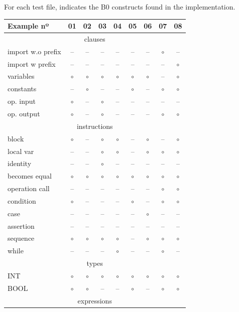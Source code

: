 \documentclass{llncs}
\begin{document}
\begin{enumerate}
For each test file, indicates the B0 constructs found in the implementation.
\begin{center}
\newcommand{\no}[0]{--}
\newcommand{\yes}[0]{$\circ$}
\begin{tabular}{|l|c|c|c|c|c|c|c|c|}
\hline
Example nº & 01 & 02 & 03 & 04 & 05 & 06 & 07 & 08 \\
\hline
\hline
\multicolumn{9}{|c|}{clauses} \\
\hline
import w.o prefix & \no & \no & \no & \no & \no & \no & \yes & \no \\
import w prefix & \no & \no & \no & \no & \no & \no & \no & \yes \\
variables & \yes & \yes & \yes & \yes & \yes & \yes & \no & \yes \\
constants & \no & \yes & \no & \no & \yes & \no & \yes & \yes \\
op. input & \yes & \no & \yes & \no & \no & \no & \no & \no \\
op. output & \yes & \no & \yes & \no & \no & \no & \yes & \yes \\
\hline
\multicolumn{9}{|c|}{instructions} \\
\hline
block & \yes & \no & \yes & \yes & \no & \yes & \no & \yes \\
local var & \no & \no & \yes & \yes & \no & \yes & \yes & \yes \\
identity & \no & \no & \yes & \no & \no & \no & \no & \no \\
becomes equal & \yes & \yes & \yes & \yes & \yes & \yes & \yes & \yes \\
operation call & \no & \no & \no & \no & \no & \no & \yes & \yes \\
condition & \yes & \no & \no & \no & \yes & \no & \yes & \yes \\
case & \no & \no & \no & \no & \no & \yes & \no & \no \\
assertion & \no & \no & \no & \no & \no & \no & \no & \no \\
sequence & \yes & \yes & \yes & \yes & \no & \yes & \yes & \yes \\
while & \no & \no & \no & \yes & \no & \no & \yes & \no \\
\hline
\multicolumn{9}{|c|}{types} \\
\hline
INT & \yes & \yes & \yes & \yes & \yes & \yes & \yes & \yes \\
BOOL & \yes & \yes & \no & \no & \yes & \no & \yes & \yes \\
\hline
\multicolumn{9}{|c|}{expressions} \\

\end{tabular}
\end{center}
\end{enumerate}
\end{document}
